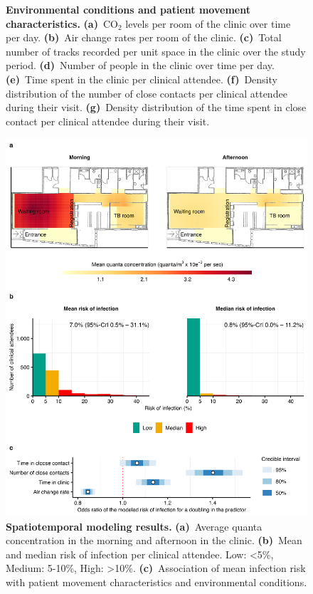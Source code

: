 \documentclass[fleqn,11pt]{wlscirep}
\begin{document}
\begin{figure}
    \caption{\textbf{Environmental conditions and patient movement characteristics.} \textbf{(a)}~CO$_2$ levels per room of the clinic over time per day. \textbf{(b)}~Air change rates per room of the clinic. \textbf{(c)}~Total number of tracks recorded per unit space in the clinic over the study period. \textbf{(d)}~Number of people in the clinic over time per day. \textbf{(e)}~Time spent in the clinic per clinical attendee. \textbf{(f)}~Density distribution of the number of close contacts per clinical attendee during their visit. \textbf{(g)}~Density distribution of the time spent in close contact per clinical attendee during their visit.}
    \label{fig:input-data-descriptives}
\end{figure}

\begin{figure}
    \centering
    \includegraphics{results/modeling/main-figure.png}
    \caption{\textbf{Spatiotemporal modeling results.} \textbf{(a)}~Average quanta concentration in the morning and afternoon in the clinic. \textbf{(b)}~Mean and median risk of infection per clinical attendee. Low: <5\%, Medium: 5-10\%, High: >10\%. \textbf{(c)}~Association of mean infection risk with patient movement characteristics and environmental conditions. }
    \label{fig:main-modeling-results}
\end{figure}
\end{document}
